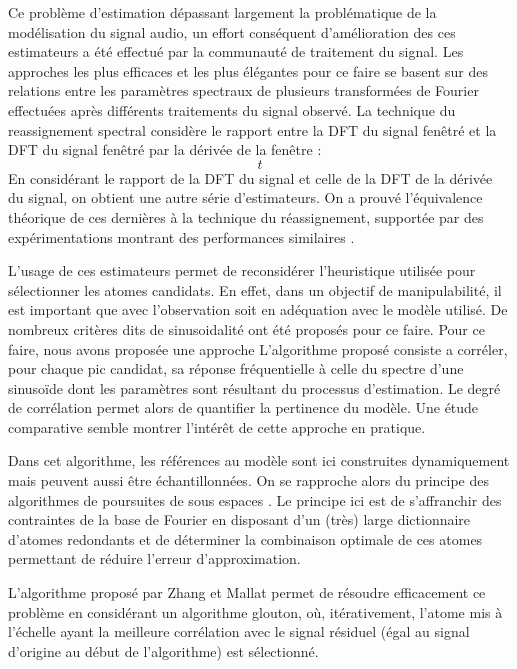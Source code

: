 
Ce problème d'estimation dépassant largement la problématique de la modélisation du signal audio, un effort conséquent d'amélioration des ces estimateurs a été effectué par la communauté de traitement du signal. Les approches les plus efficaces et les plus élégantes pour ce faire se basent sur des relations entre les paramètres spectraux de plusieurs transformées de Fourier effectuées après différents traitements du signal observé. La technique du reassignement spectral\cite{auger1995improving} considère le rapport entre la DFT du signal fenêtré et la DFT du signal fenêtré par la dérivée de la fenêtre :
\begin{equation}
t
\end{equation}
En considérant le rapport de la DFT du signal et celle de la DFT de la dérivée du signal, on obtient une autre série d'estimateurs. On a prouvé l'équivalence théorique de ces dernières à la technique du réassignement, supportée par des expérimentations montrant des performances similaires \cite{lagrangeJaes07}.

L'usage de ces estimateurs permet de reconsidérer l'heuristique utilisée pour sélectionner les atomes candidats. En effet, dans un objectif de manipulabilité, il est important que  avec l'observation  soit en adéquation avec le modèle utilisé. De nombreux critères dits de \og sinusoidalité \fg ont été proposés pour ce faire. Pour ce faire, nous avons proposée une approche \cite{peak-selection} L'algorithme proposé consiste a corréler, pour chaque pic candidat, sa réponse fréquentielle à celle du spectre d'une sinusoïde dont les paramètres sont résultant du processus d'estimation. Le degré de corrélation permet alors de quantifier la pertinence du modèle.
Une étude comparative \cite{wells2010comparative} semble montrer l'intérêt de cette approche en pratique.

Dans cet algorithme, les références au modèle sont ici construites dynamiquement mais peuvent aussi être échantillonnées. On se rapproche alors du principe des algorithmes de poursuites de sous espaces \cite{}. Le principe ici est de s'affranchir des contraintes de la base de Fourier en disposant d'un (très) large dictionnaire d'atomes redondants et de déterminer la combinaison optimale de ces atomes permettant de réduire l'erreur d'approximation.

L'algorithme proposé par Zhang et Mallat \cite{mallat1993matching} permet de résoudre efficacement ce problème en considérant un algorithme glouton, où, itérativement, l'atome mis à l'échelle ayant la meilleure corrélation avec le signal résiduel (égal au signal d'origine au début de l'algorithme) est sélectionné.

